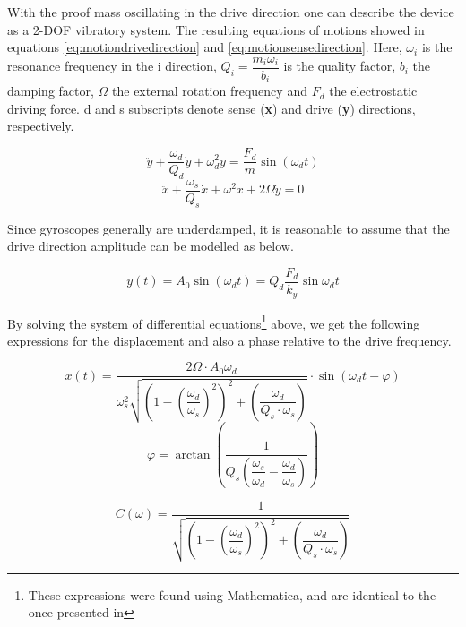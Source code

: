 \documentclass[12pt,a4paper,titlepage]{article}
\begin{document}
\begin{spacing}{1.1}
With the proof mass oscillating in the drive direction one can describe the device as a 2-DOF vibratory system. The resulting equations of motions showed in equations \ref{eq:motiondrivedirection} and \ref{eq:motionsensedirection}. Here, $\omega_i$ is the resonance frequency in the i direction, $Q_i = \dfrac{m_i \omega_i}{b_i}$ is the quality factor, $b_i$ the damping factor, $\Omega$ the external rotation frequency and $F_d$ the electrostatic driving force. d and s subscripts denote sense (\textbf{x}) and drive (\textbf{y}) directions, respectively.

\begin{equation}
\ddot{y}+\dfrac{\omega_d}{Q_d} \dot{y} + \omega_d^2 y = \dfrac{F_d}{m} \sin(\omega_d t)
\label{eq:motiondrivedirection}
\end{equation}
\begin{equation}
\ddot{x} + \dfrac{\omega_s}{Q_s} \dot{x} + \omega^2 x + 2 \Omega \dot{y} = 0
\label{eq:motionsensedirection}
\end{equation}

Since gyroscopes generally are underdamped, it is reasonable to assume that the drive direction amplitude can be modelled as below.

\begin{equation}
y(t) = A_0 \sin(\omega_d t) = Q_d \dfrac{F_d}{k_y} \sin{\omega_d t}
\label{eq:yamplitudeast}
\end{equation}

By solving the system of differential equations\footnote{These expressions were found using Mathematica, and are identical to the once presented in %
} 
above, we get the following expressions for the displacement and also a phase relative to the drive frequency.

\begin{equation}
x(t) = \dfrac{2 \Omega \cdot A_0 \omega_d}{\omega_s^2 \sqrt{\left(1-\left(\dfrac{\omega_d}{\omega_s}\right)^2\right)^2 + \left(\dfrac{\omega_d}{Q_s\cdot \omega_s}\right)}} \cdot \sin(\omega_d t - \varphi)
\label{eq:xoftraw}
\end{equation}
\begin{equation}
\varphi = \arctan \left(\dfrac{1}{Q_s \left(\dfrac{\omega_s}{\omega_d}- \dfrac{\omega_d}{\omega_s}\right)}\right)
\label{eq:phase}
\end{equation}

\begin{equation}
C(\omega) = \dfrac{1}{ \sqrt{\left(1-\left(\dfrac{\omega_d}{\omega_s}\right)^2\right)^2 + \left(\dfrac{\omega_d}{Q_s\cdot \omega_s}\right)}}
\label{eq:constant}
\end{equation}


\end{spacing}
\end{document}
